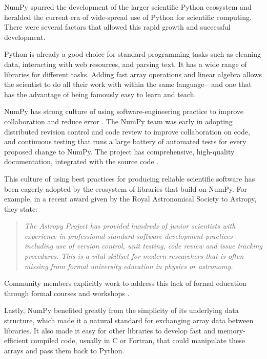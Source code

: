 
NumPy spurred the development of the larger scientific Python ecosystem and
heralded the current era of wide-spread use of Python for scientific computing.
There were several factors that allowed this rapid growth and successful
development.

Python is already a good choice for standard programming tasks such as
cleaning data, interacting with web resources, and parsing text.
It has a wide range of libraries for different tasks.
Adding fast array operations and linear algebra allows the scientist to do all
their work with within the same language---and one that has the advantage of
being famously easy to learn and teach.

NumPy has strong culture of using software-engineering practice to
improve collaboration and reduce error \cite{millman2014developing}.
The NumPy team was early in adopting distributed revision control and code
review to improve collaboration on code, and continuous testing that runs a
large battery of automated tests for every proposed change to NumPy.
The project has comprehensive, high-quality documentation, integrated with the
source code \cite{vanderwalt2008scipy,harrington2008scipy,harrington2009scipy}.


This culture of using best practices for producing reliable scientific software
has been eagerly adopted by the ecosystem of libraries that build on NumPy.
For example, in a recent award given by the Royal Astronomical Society to
Astropy, they state:
\begin{quotation}
\noindent\emph{The Astropy Project has provided hundreds of junior scientists
with experience in professional-standard software development practices
including use of version control, unit testing, code review and issue tracking
procedures. This is a vital skillset for modern researchers that is often
missing from formal university education in physics or astronomy.}
\end{quotation}
Community members explicitly work to address this lack of formal education
through formal courses and workshops
\cite{wilson-software-carpentry,hannay-scientific-software-survey,millman2018teaching}.

Lastly, NumPy benefited greatly from the simplicity of its underlying data
structure, which made it a natural standard for exchanging array data between
libraries.  It also made it easy for other libraries to develop fast and
memory-efficient compiled code, usually in C or Fortran, that could manipulate
these arrays and pass them back to Python.

